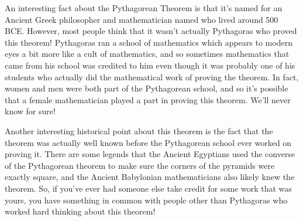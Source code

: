 \documentclass{ximera}
\begin{document}
An interesting fact about the Pythagorean Theorem is that it's named for an Ancient Greek philosopher and mathematician named  who lived around 500 BCE. However, most people think that it wasn't actually Pythagoras who proved this theorem! Pythagoras ran a school of mathematics which appears to modern eyes a bit more like a cult of mathematics, and so sometimes mathematics that came from his school was credited to him even though it was probably one of his students who actually did the mathematical work of proving the theorem. In fact, women and men were both part of the Pythagorean school, and so it's possible that a female mathematician played a part in proving this theorem. We'll never know for sure!

Another interesting historical point about this theorem is the fact that the theorem was actually well known before the Pythagorean school ever worked on proving it. There are some legends that the Ancient Egyptians used the converse of the Pythagorean theorem to make sure the corners of the pyramids were exactly square, and the Ancient Babylonian mathematicians also likely knew the theorem. So, if you've ever had someone else take credit for some work that was yours, you have something in common with people other than Pythagoras who worked hard thinking about this theorem!
\end{document}

